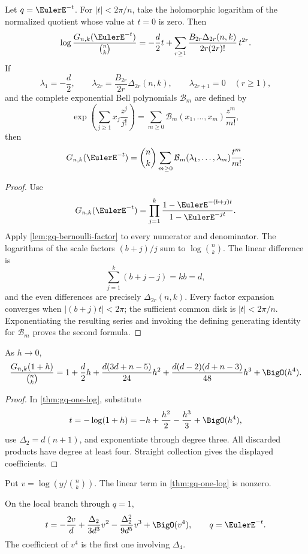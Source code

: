\begin{theorem}
\label{thm:gq-one-log}
Let \(q=\EulerE^{-t}\).  For \(|t|<2\pi/n\), take the holomorphic logarithm
of the normalized quotient whose value at \(t=0\) is zero.  Then
\[
  \log\frac{G_{n,k}(\EulerE^{-t})}{\binom nk}
  =-\frac d2t
   +\sum_{r\ge1}
    \frac{B_{2r}\Delta_{2r}(n,k)}
         {2r(2r)!}\,t^{2r}.
\]
If
\[
  \lambda_1=-\frac d2,\qquad
  \lambda_{2r}=\frac{B_{2r}}{2r}\Delta_{2r}(n,k),
  \qquad
  \lambda_{2r+1}=0\quad(r\ge1),
\]
and the complete exponential Bell polynomials \(\mathcal B_m\) are defined by
\[
  \exp\left(\sum_{j\ge1}x_j\frac{z^j}{j!}\right)
  =\sum_{m\ge0}\mathcal B_m(x_1,\ldots,x_m)\frac{z^m}{m!},
\]
then
\[
  G_{n,k}(\EulerE^{-t})
  =\binom nk\sum_{m\ge0}
    \mathcal B_m(\lambda_1,\ldots,\lambda_m)\frac{t^m}{m!}.
\]
\end{theorem}

\begin{proof}
Use
\[
  G_{n,k}(\EulerE^{-t})
  =\prod_{j=1}^{k}
    \frac{1-\EulerE^{-(b+j)t}}{1-\EulerE^{-jt}}.
\]
Apply \cref{lem:gq-bernoulli-factor} to every numerator and denominator.
The logarithms of the scale factors \((b+j)/j\) sum to
\(\log\binom nk\).  The linear difference is
\[
  \sum_{j=1}^{k}(b+j-j)=kb=d,
\]
and the even differences are precisely
\(\Delta_{2r}(n,k)\).  Every factor expansion converges when
\(|(b+j)t|<2\pi\); the sufficient common disk is \(|t|<2\pi/n\).
Exponentiating the resulting series and invoking the defining generating
identity for \(\mathcal B_m\) proves the second formula.
\end{proof}

\begin{corollary}[Literal Taylor coordinate \(h=q-1\)]
\label{cor:gq-one-h}
As \(h\to0\),
\[
  \frac{G_{n,k}(1+h)}{\binom nk}
  =1+\frac d2h
   +\frac{d(3d+n-5)}{24}h^2
   +\frac{d(d-2)(d+n-3)}{48}h^3
   +\BigO(h^4).
\]
\end{corollary}

\begin{proof}
In \cref{thm:gq-one-log}, substitute
\[
  t=-\log(1+h)=-h+\frac{h^2}{2}-\frac{h^3}{3}
  +\BigO(h^4),
\]
use \(\Delta_2=d(n+1)\), and exponentiate through degree three.
All discarded products have degree at least four.  Straight collection gives
the displayed coefficients.
\end{proof}

Put \(v=\log(y/\binom nk)\).  The linear term in
\cref{thm:gq-one-log} is nonzero.

\begin{corollary}[Ordinary Gaussian inverse at \(q=1\)]
\label{cor:gq-one-inverse}
On the local branch through \(q=1\),
\[
  t=-\frac{2v}{d}
    +\frac{\Delta_2}{3d^3}v^2
    -\frac{\Delta_2^2}{9d^5}v^3
    +\BigO(v^4),
  \qquad q=\EulerE^{-t}.
\]
The coefficient of \(v^4\) is the first one involving \(\Delta_4\).
\end{corollary}

